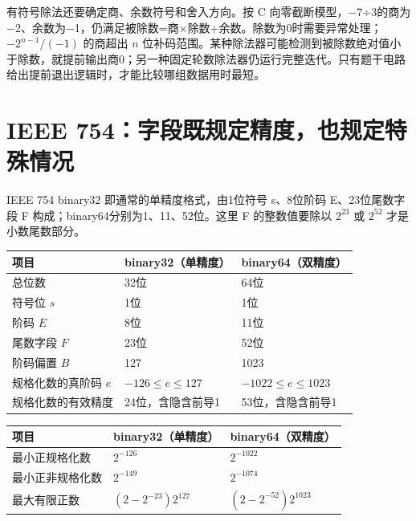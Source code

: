 有符号除法还要确定商、余数符号和舍入方向。按 C 向零截断模型，\ensuremath{-}7÷3的商为\ensuremath{-}2、余数为\ensuremath{-}1，仍满足被除数=商\ensuremath{\times}除数+余数。除数为0时需要异常处理；\(-2^{n-1}/(-1)\) 的商超出 \(n\) 位补码范围。某种除法器可能检测到被除数绝对值小于除数，就提前输出商0；另一种固定轮数除法器仍运行完整迭代。只有题干电路给出提前退出逻辑时，才能比较哪组数据用时最短。

\section{IEEE 754：字段既规定精度，也规定特殊情况}\label{CO02-18}

IEEE 754 binary32 即通常的单精度格式，由1位符号 s、8位阶码 E、23位尾数字段 F 构成；binary64分别为1、11、52位。这里 F 的整数值要除以 \(2^{23}\) 或 \(2^{52}\) 才是小数尾数部分。

\par\medskip\noindent\begin{minipage}{\linewidth}\fontsize{9.3}{12}\selectfont\begin{tabularx}{\linewidth}{@{}YYY@{}}
\toprule\noalign{}
项目 & binary32（单精度） & binary64（双精度） \\
\midrule\noalign{}


总位数 & 32位 & 64位 \\
符号位 \(s\) & 1位 & 1位 \\
阶码 \(E\) & 8位 & 11位 \\
尾数字段 \(F\) & 23位 & 52位 \\
阶码偏置 \(B\) & 127 & 1023 \\
规格化数的真阶码 \(e\) & \(-126\le e\le127\) & \(-1022\le e\le1023\) \\
规格化数的有效精度 & 24位，含隐含前导1 & 53位，含隐含前导1 \\
\bottomrule\end{tabularx}
\end{minipage}\par\medskip

\par\medskip\noindent\begin{minipage}{\linewidth}\fontsize{9.3}{12}\selectfont\begin{tabularx}{\linewidth}{@{}YYY@{}}
\toprule\noalign{}
项目 & binary32（单精度） & binary64（双精度） \\
\midrule\noalign{}


最小正规格化数 & \(2^{-126}\) & \(2^{-1022}\) \\
最小正非规格化数 & \(2^{-149}\) & \(2^{-1074}\) \\
最大有限正数 & \((2-2^{-23})2^{127}\) & \((2-2^{-52})2^{1023}\) \\
\bottomrule\end{tabularx}
\end{minipage}\par\medskip

